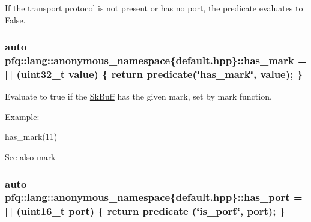 If the transport protocol is not present or has no port, the predicate evaluates to False. 
\subsubsection[{\texorpdfstring{has\+\_\+mark}{has_mark}}]{\setlength{\rightskip}{0pt plus 5cm}auto pfq\+::lang\+::anonymous\+\_\+namespace\{default.\+hpp\}\+::has\+\_\+mark = \mbox{[}$\,$\mbox{]} (uint32\+\_\+t value) \{ return {\bf predicate}(\char`\"{}has\+\_\+mark\char`\"{}, value); \}}\hypertarget{namespacepfq_1_1lang_1_1anonymous__namespace_02default_8hpp_03_aa4ce1fdb0d99e1ca0afdf76619c58d12}{}\label{namespacepfq_1_1lang_1_1anonymous__namespace_02default_8hpp_03_aa4ce1fdb0d99e1ca0afdf76619c58d12}


Evaluate to {\ttfamily true} if the \hyperlink{structpfq_1_1lang_1_1SkBuff}{Sk\+Buff} has the given {\ttfamily mark}, set by mark function. 

Example\+:

has\+\_\+mark(11)

\begin{DoxySeeAlso}{See also}
\hyperlink{namespacepfq_1_1lang_1_1anonymous__namespace_02default_8hpp_03_a7b831baeabda070b89ca862a9445a4a8}{mark} 
\end{DoxySeeAlso}
\subsubsection[{\texorpdfstring{has\+\_\+port}{has_port}}]{\setlength{\rightskip}{0pt plus 5cm}auto pfq\+::lang\+::anonymous\+\_\+namespace\{default.\+hpp\}\+::has\+\_\+port = \mbox{[}$\,$\mbox{]} (uint16\+\_\+t {\bf port}) \{ return {\bf predicate} (\char`\"{}is\+\_\+port\char`\"{}, port); \}}\hypertarget{namespacepfq_1_1lang_1_1anonymous__namespace_02default_8hpp_03_a9f7161b8dfb842c5a845f413eb6bc82f}{}\label{namespacepfq_1_1lang_1_1anonymous__namespace_02default_8hpp_03_a9f7161b8dfb842c5a845f413eb6bc82f}


